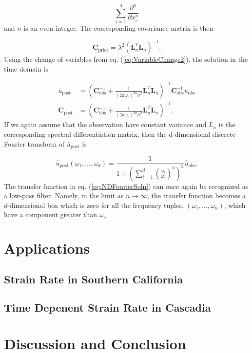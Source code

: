 \documentclass[10pt,a4paper]{article}
\begin{document}
\begin{equation}
  \sum_{i=1}^d\frac{\partial^n}{\partial x_i^n} 
\end{equation} 
and $n$ is an even integer. The corresponding covariance matrix is then

\begin{equation}\label{eq:NDCovariance}
\mathbf{C}_\mathrm{prior} = \lambda^2\left(\mathbf{L}_n^T\mathbf{L}_n\right)^{-1}. 
\end{equation}           
Using the change of variables from eq. (\ref{eq:VariableChange2}), the solution in the time domain is

\begin{equation}\label{eq:NDSolution}
\begin{split}
\bar{u}_\mathrm{post} &= (\mathbf{C}_\mathrm{obs}^{-1} +   
                   \frac{1}{(2\pi\omega_c)^{2n}\bar{\sigma}^2}\mathbf{L}_n^T\mathbf{L}_n)^{-1}\mathbf{C}_\mathrm{obs}^{-1}
                   u_\mathrm{obs}
\\
\mathbf{C}_\mathrm{post} &= (\mathbf{C}_\mathrm{obs}^{-1} +   
                            \frac{1}{(2\pi\omega_c)^{2n}\bar{\sigma}^2}\mathbf{L}_n^T\mathbf{L}_n)^{-1}.
\end{split}
\end{equation}
If we again assume that the observation have constant variance and $L_n$ is the corresponding spectral differentiation matrix, then the d-dimensional discrete Fourier transform of $\bar{u}_\mathrm{post}$ is 

\begin{equation}\label{eq:NDFourierSoln}
  \hat{u}_\mathrm{post}(\omega_1, \dots, \omega_d) = 
  \frac{1}{1 + \left(\sum_{i=1}^d \left(\frac{\omega_i}{\omega_c}\right)^n\right)^2} \hat{u}_\mathrm{obs}.
\end{equation}
The transfer function in eq. (\ref{eq:NDFourierSoln}) can once again be recognized as a low-pass filter.  Namely, in the limit as $n \to \infty$, the transfer function becomes a $d$-dimensional box which is zero for all the frequency tuples, $(\omega_1,\dots,\omega_n)$, which have a component greater than $\omega_c$. 

\section{Applications}

\subsection{Strain Rate in Southern California}

\subsection{Time Depenent Strain Rate in Cascadia}

\section{Discussion and Conclusion}



  
 
\end{document}
